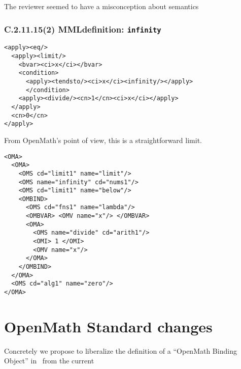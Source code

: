 \documentclass{llncs}
\begin{document}
\begin{newpart}{The reviewer seemed to have a misconception about semantics}
\subsubsection{C.2.11.15(2) MMLdefinition: {\tt infinity}}\label{C211152}
\begin{lstlisting}[language=MathML2]
<apply><eq/>
  <apply><limit/>
    <bvar><ci>x</ci></bvar>
    <condition>
      <apply><tendsto/><ci>x</ci><infinity/></apply>
      </condition>
    <apply><divide/><cn>1</cn><ci>x</ci></apply>
  </apply>
  <cn>0</cn>
</apply>
\end{lstlisting}
From OpenMath's point of view, this is a straightforward limit.
\begin{lstlisting} 
<OMA>
  <OMA>
    <OMS cd="limit1" name="limit"/>
    <OMS name="infinity" cd="nums1"/>
    <OMS cd="limit1" name="below"/>
    <OMBIND>
      <OMS cd="fns1" name="lambda"/>
      <OMBVAR> <OMV name="x"/> </OMBVAR>
      <OMA>
        <OMS name="divide" cd="arith1"/>
        <OMI> 1 </OMI>
        <OMV name="x"/>
      </OMA>
    </OMBIND>
  </OMA>
  <OMS cd="alg1" name="zero"/>
</OMA>
\end{lstlisting}
\fi

\iffull
\appendix
\section{OpenMath Standard changes}
Concretely we propose to liberalize the definition of a ``OpenMath Binding
Object'' in~\cite[section 2.1.3]{OpenMath2004a} from the current


\end{newpart}
\end{document}
